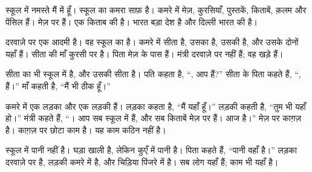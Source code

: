 \documentclass[12pt]{nextbook}
\begin{document}
\begin{readersection}{स्कूल में नमस्ते}
 मैं  में हूँ। स्कूल का कमरा साफ़ है। कमरे में मेज़, कुरसियाँ, पुस्तकें, किताबें, क़लम और पेंसिल हैं। मेज़ पर  हैं। एक किताब  की है। भारत बड़ा देश है और दिल्ली भारत की  है।

दरवाज़े पर एक आदमी है। वह स्कूल का  है। कमरे में सीता है, उसका  है, उसकी  है, और उसके  दोनों यहाँ हैं। सीता की माँ कुरसी पर है। पिता मेज़ के पास हैं। मंत्री दरवाज़े पर  नहीं हैं; वह खड़े हैं।

सीता का  भी स्कूल में है, और उसकी  सीता है। पति कहता है, “, आप  हैं?” सीता के पिता कहते हैं, “,   हैं।” माँ कहती है, “मैं भी ठीक हूँ।”

कमरे में एक लड़का और एक लड़की हैं। लड़का कहता है, “मैं यहाँ हूँ।” लड़की कहती है, “तुम भी यहाँ हो।” मंत्री कहते हैं, “। आप सब स्कूल में हैं, और सब किताबें मेज़ पर हैं। आज  है।” मेज़ पर काग़ज़ है। काग़ज़ पर छोटा काम है। यह काम कठिन नहीं है।

 स्कूल में पानी नहीं है। घड़ा खाली है, लेकिन कुएँ में पानी है। पिता कहते हैं, “पानी वहाँ है।” लड़का दरवाज़े पर है, लड़की कमरे में है, और चिड़िया पिंजरे में है। सब लोग यहाँ हैं; काम भी यहाँ है।
\end{readersection}
\end{document}
